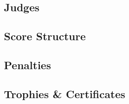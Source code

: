 
\subsection{Judges}


\subsection{Score Structure}


\subsection{Penalties}


\subsection{Trophies \& Certificates}
